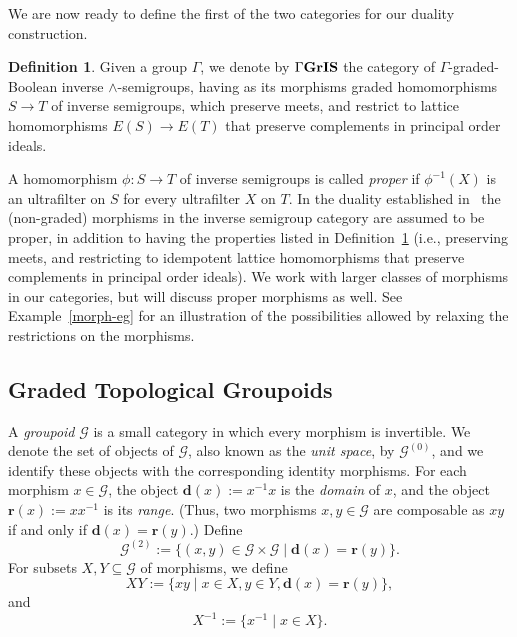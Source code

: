 \documentclass[a4paper,reqno,12pt]{amsart}
\numberwithin{equation}{section}
\theoremstyle{plain}
\theoremstyle{definition}
\newtheorem{deff}[thm]{Definition}
\newcommand{\ran}{\bm{r}}
\newcommand{\domr}{\bm{d}}
\newcommand{\GIS}{\operatorname{\Gamma\bf{GrIS}}}
\begin{document}
We are now ready to define the first of the two categories for our duality construction.

\begin{deff} \label{is-cat-def}
Given a group $\Gamma$, we denote by $\GIS$ the category of $\Gamma$-graded-Boolean inverse $\land$-semigroups, having as its morphisms graded homomorphisms $S \to T$ of inverse semigroups, which preserve meets, and restrict to lattice homomorphisms $E(S) \to E(T)$ that preserve complements in principal order ideals.
\end{deff}

A homomorphism $\phi : S \to T$ of inverse semigroups is called \emph{proper} if $\phi^{-1}(X)$ is an ultrafilter on $S$ for every ultrafilter $X$ on $T$. In the duality established in~\cite{Lawson2, Lawson3} the (non-graded) morphisms in the inverse semigroup category are assumed to be proper, in addition to having the properties listed in Definition~\ref{is-cat-def} (i.e., preserving meets, and restricting to idempotent lattice homomorphisms that preserve complements in principal order ideals). We work with larger classes of morphisms in our categories, but will discuss proper morphisms as well. See Example~\ref{morph-eg} for an illustration of the possibilities allowed by relaxing the restrictions on the morphisms.

\subsection{Graded Topological Groupoids} \label{groupoidsubsection}

A \emph{groupoid} $\mathscr{G}$ is a small category in which every morphism is invertible. We denote the set of objects of $\mathscr{G}$, also known as the \emph{unit space}, by $\mathscr{G}^{(0)}$, and we identify these objects with the corresponding identity morphisms. For each morphism $x \in \mathscr{G}$, the object $\domr(x):=x^{-1}x$ is the \emph{domain} of $x$, and the object $\ran(x):=xx^{-1}$ is its \emph{range}. (Thus, two morphisms $x, y \in \mathscr{G}$ are composable as $xy$ if and only if $\domr(x)=\ran(y)$.) Define 
\[\mathscr{G}^{(2)} := \big \{(x,y) \in \mathscr{G} \times \mathscr{G} \mid \domr(x) = \ran(y) \big\}.\]
For subsets $X,Y\subseteq \mathscr{G}$ of morphisms, we define
\begin{equation}\label{pofgtryhf}
XY:=\big \{xy \mid x \in X, y \in Y, \domr(x)=\ran(y) \big\},
\end{equation}
and
\begin{equation}\label{pofgtryhf2}
X^{-1}:=\big \{x^{-1} \mid x \in X \big \}.
\end{equation}
\end{document}
